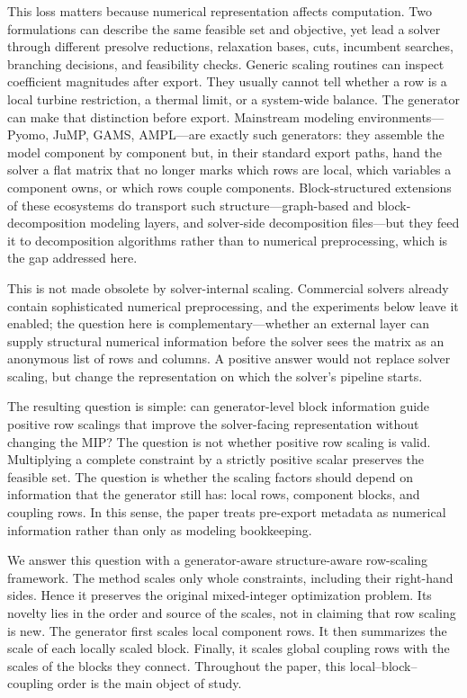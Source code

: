 \documentclass[AMA,Times1COL]{WileyNJDv5} %
\providecommand{\DIFadd}[1]{{\protect\color{blue} \sf #1}} %
\providecommand{\DIFdel}[1]{{\protect\color{red} \scriptsize #1}} %
\providecommand{\DIFaddbegin}{} %
\providecommand{\DIFaddend}{} %
\providecommand{\DIFdelbegin}{} %
\providecommand{\DIFdelend}{} %
\begin{document}
This loss matters because numerical representation affects computation. Two formulations
can describe the same feasible set and objective, yet lead a solver through different
presolve reductions, relaxation bases, cuts, incumbent searches, branching decisions, and
feasibility checks. Generic scaling routines can inspect coefficient magnitudes after
export. They usually cannot tell whether a row is a local turbine restriction, a thermal
limit, or a system-wide balance. The generator can make that distinction before export.
\DIFaddbegin \DIFadd{Mainstream modeling environments---Pyomo, JuMP, GAMS, AMPL---are exactly such generators:
they assemble the model component by component but, in their standard export paths, hand the
solver a flat matrix that no longer marks which rows are local, which variables a component
owns, or which rows couple components. Block-structured extensions of these ecosystems do
transport such structure---graph-based and block-decomposition modeling layers, and
solver-side decomposition files---but they feed it to decomposition algorithms rather than to
numerical preprocessing, which is the gap addressed here.
}

\DIFadd{This is not made obsolete by solver-internal scaling. Commercial solvers already contain
sophisticated numerical preprocessing, and the experiments below leave it enabled; the
question here is complementary---whether an external layer can supply structural numerical
information before the solver sees the matrix as an anonymous list of rows and columns. A
positive answer would not replace solver scaling, but change the representation on which the
solver's pipeline starts.
}\DIFaddend 

The resulting question is simple: can generator-level block information guide positive row scalings that improve the solver-facing representation without changing the MIP? The question is not whether positive row scaling is valid. Multiplying a complete constraint by a strictly positive scalar preserves the feasible set. The question is whether the scaling factors should depend on information that the generator still has: local rows, component blocks, and coupling rows. In this sense, the paper treats pre-export metadata as numerical information rather than only as modeling bookkeeping.

We answer this question with a \DIFdelbegin \DIFdel{generator-aware }\DIFdelend \DIFaddbegin \DIFadd{structure-aware }\DIFaddend row-scaling framework. The method scales
only whole constraints, including their right-hand sides. Hence it preserves the original
mixed-integer optimization problem. Its novelty lies in the order and source of the
scales, not in claiming that row scaling is new. The generator first scales local component
rows. It then summarizes the scale of each locally scaled block. Finally, it scales global
coupling rows with the scales of the blocks they connect. Throughout the paper, this
local--block--coupling order is the main object of study.
\end{document}
